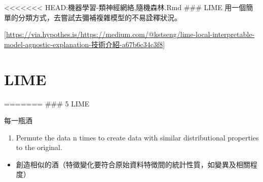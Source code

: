 \documentclass[]{book}
\newenvironment{Shaded}{\begin{snugshade}}{\end{snugshade}}
\newcommand{\KeywordTok}[1]{\textcolor[rgb]{0.13,0.29,0.53}{\textbf{#1}}}
\newcommand{\DataTypeTok}[1]{\textcolor[rgb]{0.13,0.29,0.53}{#1}}
\newcommand{\DecValTok}[1]{\textcolor[rgb]{0.00,0.00,0.81}{#1}}
\newcommand{\StringTok}[1]{\textcolor[rgb]{0.31,0.60,0.02}{#1}}
\newcommand{\OperatorTok}[1]{\textcolor[rgb]{0.81,0.36,0.00}{\textbf{#1}}}
\newcommand{\NormalTok}[1]{#1}
\providecommand{\tightlist}{%
  \setlength{\itemsep}{0pt}\setlength{\parskip}{0pt}}
\begin{document}
\textless{}\textless{}\textless{}\textless{}\textless{}\textless{}\textless{} HEAD:機器學習-類神經網絡,隨機森林.Rmd
\#\#\# LIME 用一個簡單的分類方式，去嘗試去彌補複雜模型的不易詮釋狀況。

{[}\url{https://via.hypothes.is/https://medium.com/@kstseng/lime-local-interpretable-model-agnostic-explanation-技術介紹-a67b6c34c3f8}{]}

\hypertarget{lime}{%
\section{LIME}\label{lime}}

\begin{Shaded}
\end{Shaded}

=======
\#\#\# 5 LIME

每一瓶酒

\begin{enumerate}
\def\labelenumi{\arabic{enumi}.}
\tightlist
\item
  Permute the data n times to create data with similar distributional properties to the original.
\end{enumerate}

\begin{itemize}
\tightlist
\item
  創造相似的酒（特徵變化要符合原始資料特徴間的統計性質，如變異及相關程度）
\end{itemize}
\end{document}
